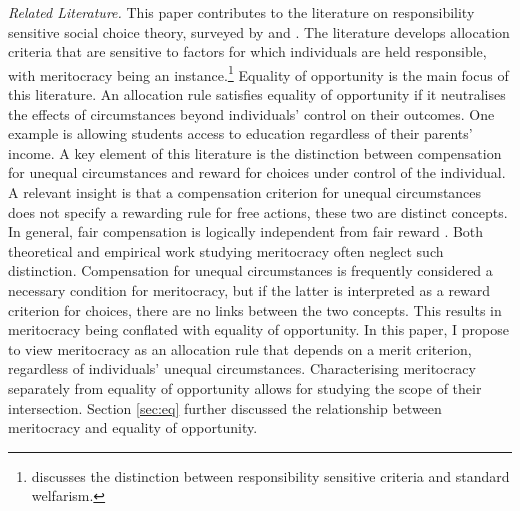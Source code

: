 \emph{Related Literature.} This paper contributes to the literature on responsibility sensitive social choice theory, surveyed by \cite{fleurbaeyFairnessResponsibilityWelfare2008} and \cite{roemerEqualityOpportunityTheory2016}. The literature develops allocation criteria that are sensitive to factors for which individuals are held responsible, with meritocracy being an instance.\footnote{\cite{carrollEqualOpportunityDifferent2025} discusses the distinction between responsibility sensitive criteria and standard welfarism.} Equality of opportunity is the main focus of this literature. An allocation rule satisfies equality of opportunity if it neutralises the effects of circumstances beyond individuals' control on their outcomes. One example is allowing students access to education regardless of their parents' income. A key element of this literature is the distinction between compensation for unequal circumstances and reward for choices under control of the individual. A relevant insight is that a compensation criterion for unequal circumstances does not specify a rewarding rule for free actions, these two are distinct concepts. In general, fair compensation is logically independent from fair reward \citep{moulinFairDivisionCollective2004}. Both theoretical and empirical work studying meritocracy often neglect such distinction. Compensation for unequal circumstances is frequently considered a necessary condition for meritocracy, but if the latter is interpreted as a reward criterion for choices, there are no links between the two concepts. This results in meritocracy being conflated with equality of opportunity. In this paper, I propose to view meritocracy as an allocation rule that depends on a merit criterion, regardless of individuals' unequal circumstances. Characterising meritocracy separately from equality of opportunity allows for studying the scope of their intersection. Section \ref{sec:eq} further discussed the relationship between meritocracy and equality of opportunity.


